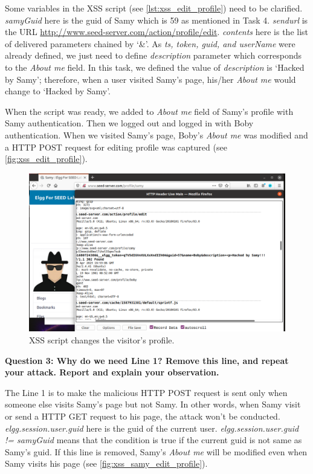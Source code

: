 Some variables in the XSS script (see \autoref{lst:xss_edit_profile}) need to be clarified.
\emph{samyGuid} here is the guid of Samy which is 59 as mentioned in Task 4. \emph{sendurl}
is the URL \url{http://www.seed-server.com/action/profile/edit}. \emph{contents} here is
the list of delivered parameters chained by `\&'. As \emph{ts, token, guid, and userName} were
already defined, we just need to define \emph{description} parameter which corresponds to
the \emph{About me} field. In this task, we defined the value of \emph{description} is
`Hacked by Samy'; therefore, when a user visited Samy's page, his/her \emph{About me} would
change to `Hacked by Samy'.

When the script was ready, we added to \emph{About me} field of Samy's profile with Samy
authentication. Then we logged out and logged in with Boby authentication. When we visited
Samy's page, Boby's \emph{About me} was modified and a HTTP POST request for editing profile
was captured (see \autoref{fig:xss_edit_profile}).

\begin{figure}[h]
    \centering
    \includegraphics[height=\textheight,width=\textwidth,keepaspectratio]
    {figures/XSS_edit_profile.png}
    \caption{XSS script changes the visitor's profile.}
    \label{fig:xss_edit_profile}
\end{figure}

\textbf{Question 3: Why do we need Line 1? Remove this line, and repeat your attack.
Report and explain your observation.}

The Line 1 is to make the malicious HTTP POST request is sent only when someone else visits
Samy's page but not Samy. In other words, when Samy visit or send a HTTP GET request to his
page, the attack won't be conducted. \emph{elgg.session.user.guid} here is the guid of the
current user. \emph{elgg.session.user.guid != samyGuid} means that the condition is true if the
current guid is not same as Samy's guid. If this line is removed, Samy's \emph{About me}
will be modified even when Samy visits his page (see \autoref{fig:xss_samy_edit_profile}).

